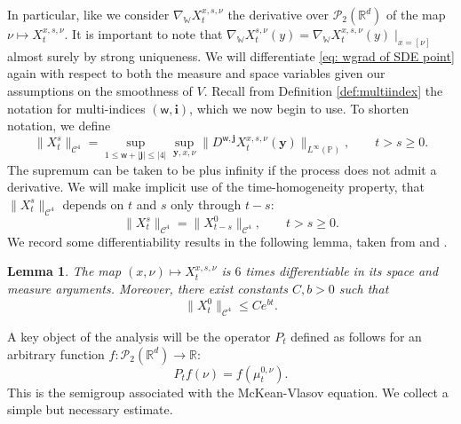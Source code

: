 \documentclass[11pt,reqno]{amsart}
\numberwithin{equation}{section}
\newtheorem{lemma}[theorem]{Lemma}
\theoremstyle{definition}
\def\R{{\mathbb R}}
\def\P{{\mathbb P}}
\newcommand{\wgrad}{\nabla_{\W}}
\newcommand{\W}{\mathbb W}
\begin{document}
In particular, like \cite{Buckdahn2017-op} we consider $\wgrad X_t^{x,s,\nu}$ the derivative over $\mathcal P_2(\R^d)$ of the map $\nu\mapsto X_t^{x,s,\nu}$.
It is important to note that $\wgrad X_t^{s,\nu}(y)=\wgrad X_t^{x,s,\nu}(y)\mid _{x=[\nu]}$ almost surely by strong uniqueness. 
We will differentiate \eqref{eq: wgrad of SDE point} again with respect to both the measure and space variables given our assumptions on the smoothness of $ V$.
Recall  from Definition \ref{def:multiindex} the notation for multi-indices $(\mathsf{w},\boldsymbol{i})$, which we now begin to use.
To shorten notation, we define 
\begin{equation} \label{def:C4notation}
\|X^s_t\|_{\mathcal{C}^4}=\sup_{1\leq \mathsf w +|\boldsymbol{j}|\leq| 4|}\sup_{\boldsymbol{y},x,\nu}\|D^{\mathsf w,\boldsymbol{j}}X_t^{x,s,\nu}(\boldsymbol{y})\|_{L^\infty(\P)}, \qquad t > s \ge 0.
\end{equation}
The supremum can be taken to be plus infinity if the process does not admit a derivative. 
We will make implicit use of the time-homogeneity property, that $\|X^s_t\|_{\mathcal{C}^4}$ depends on $t$ and $s$ only through $t-s$:
\[
\|X^s_t\|_{\mathcal{C}^4} = \|X^0_{t-s}\|_{\mathcal{C}^4}, \qquad  t > s \ge 0.
\]
We record some differentiability results in the following lemma, taken from \cite[Theorem 3.4]{Chassagneux2022-jt} and \cite[Theorem 3.2]{Crisan2017Smoothing}.
\begin{lemma}
\label{lm: estimates on flows}
    The map $(x,\nu) \mapsto X_t^{x,s,\nu}$ is $6$ times differentiable in its space and measure arguments. Moreover, there exist constants $C,b>0$ such that 
    \[\|X_t^{0}\|_{\mathcal C^4}\leq Ce^{bt}.\]
\end{lemma}
A key object of the analysis will be the operator $P_t$ defined as follows for an arbitrary function $f:\mathcal P_2(\R^d)\to \R$:
\[
    P_tf (\nu)= f(\mu_t^{0,\nu}).
\]
This is the semigroup associated with the McKean-Vlasov equation.
We collect a simple but necessary estimate.
\end{document}
